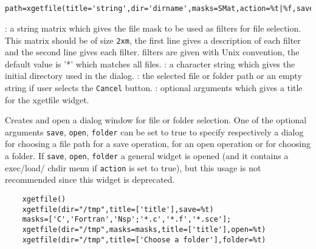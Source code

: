 
\begin{mandesc}
  \\ %
\end{mandesc}
\label{xgetfile}
\begin{calling_sequence}
  \begin{verbatim}
    path=xgetfile(title='string',dir='dirname',masks=SMat,action=%t|%f,save=%t|%,open=%t|%f,folder=%t|%f)
  \end{verbatim}
\end{calling_sequence}
\begin{parameters}
  \begin{varlist}
    : a string matrix which gives the file mask to be used as filters for file selection. This matrix should be of size \verb+2xm+, the first line 
gives a description of each filter and the second line gives each filter. 
filters are given with Unix convention, the default value is '*' which matches all files.
    : a character string which gives the initial directory used in the dialog. 
    : the selected file or folder path or an empty string if user selects the \verb+Cancel+ 
    button.
    : optional arguments which gives a title for the xgetfile widget.
  \end{varlist}
\end{parameters}
\begin{mandescription}
  Creates and open a dialog window for file or folder selection. One of the optional arguments 
  \verb+save+, \verb+open+, \verb+folder+ can be set to true to specify respectively a dialog 
  for choosing a file path for a save operation, for an open operation or for choosing a folder. 
  If \verb+save+, \verb+open+, \verb+folder+ a general widget is opened (and it contains a exec/load/
  chdir menu if \verb+action+ is set to true), but this usage is not recommended since this 
  widget is deprecated.
\end{mandescription}
\begin{examples}
  \begin{Verbatim} 
    xgetfile()
    xgetfile(dir="/tmp",title=['title'],save=%t)
    masks=['C','Fortran','Nsp';'*.c','*.f','*.sce'];
    xgetfile(dir="/tmp",masks=masks,title=['title'],open=%t)
    xgetfile(dir="/tmp",title=['Choose a folder'],folder=%t)
  \end{Verbatim} 
\end{examples}


